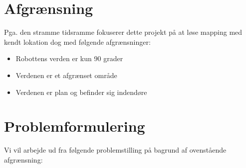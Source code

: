 \section*{Afgrænsning}
Pga. den stramme tidsramme fokuserer dette projekt på at løse mapping med kendt lokation dog med følgende afgrænsninger:
\begin{itemize}
\item Robottens verden er kun 90 grader
\item Verdenen er et afgrænset område
\item Verdenen er plan og befinder sig indendøre
\end{itemize}

\section*{Problemformulering}
Vi vil arbejde ud fra følgende problemstilling på bagrund af ovenstående afgrænsning:

\begin{samepage}


\end{samepage}